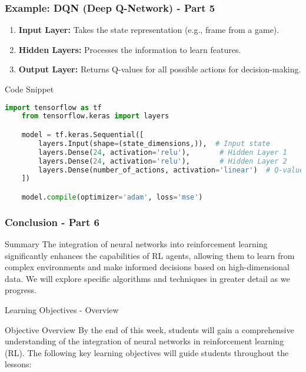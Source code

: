 \documentclass[aspectratio=169]{beamer}
\begin{document}
\begin{frame}[fragile]
  \frametitle{Example: DQN (Deep Q-Network) - Part 5}
  \begin{enumerate}
    \item \textbf{Input Layer:} Takes the state representation (e.g., frame from a game).
    \item \textbf{Hidden Layers:} Processes the information to learn features.
    \item \textbf{Output Layer:} Returns Q-values for all possible actions for decision-making.
  \end{enumerate}
  \begin{block}{Code Snippet}
    \begin{lstlisting}[language=Python]
    import tensorflow as tf
    from tensorflow.keras import layers

    model = tf.keras.Sequential([
        layers.Input(shape=(state_dimensions,)),  # Input state
        layers.Dense(24, activation='relu'),       # Hidden Layer 1
        layers.Dense(24, activation='relu'),       # Hidden Layer 2
        layers.Dense(number_of_actions, activation='linear')  # Q-values output
    ])

    model.compile(optimizer='adam', loss='mse')
    \end{lstlisting}
  \end{block}
\end{frame}

\begin{frame}[fragile]
  \frametitle{Conclusion - Part 6}
  \begin{block}{Summary}
    The integration of neural networks into reinforcement learning significantly enhances the capabilities of RL agents, allowing them to learn from complex environments and make informed decisions based on high-dimensional data. We will explore specific algorithms and techniques in greater detail as we progress.
  \end{block}
\end{frame}

\begin{frame}[fragile]{Learning Objectives - Overview}
    \begin{block}{Objective Overview}
        By the end of this week, students will gain a comprehensive understanding of the integration of neural networks in reinforcement learning (RL). The following key learning objectives will guide students throughout the lessons:
    \end{block}
\end{frame}
\end{document}
